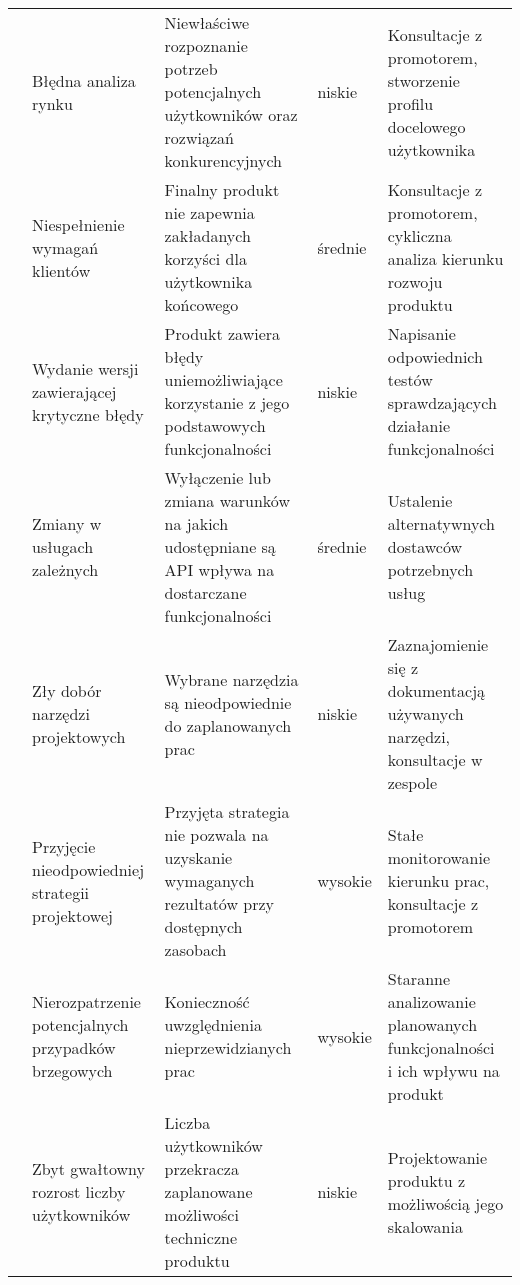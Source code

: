 \begin{longtable}{|p{.1\linewidth}|p{}|p{}|p{}|p{}|}
    \hline
    \pagebreak
    \hline
    \multirow{5}{=}{\parbox[c]{10cm}{}} & Błędna analiza rynku & Niewłaściwe rozpoznanie potrzeb potencjalnych użytkowników oraz rozwiązań konkurencyjnych & niskie
    & Konsultacje z promotorem, stworzenie profilu docelowego użytkownika \\
    \cline{2-5}
    & Niespełnienie wymagań klientów & Finalny produkt nie zapewnia zakładanych korzyści dla użytkownika końcowego & średnie
    & Konsultacje z promotorem, cykliczna analiza kierunku rozwoju produktu \\
    \cline{2-5}
    & Wydanie wersji zawierającej krytyczne błędy & Produkt zawiera błędy uniemożliwiające korzystanie z jego podstawowych funkcjonalności & niskie
    & Napisanie odpowiednich testów sprawdzających działanie funkcjonalności \\
    \cline{2-5}
    & Zmiany w usługach zależnych & Wyłączenie lub zmiana warunków na jakich udostępniane są API wpływa na dostarczane funkcjonalności & średnie
    & Ustalenie alternatywnych dostawców potrzebnych usług \\
    \cline{2-5}
    & Zły dobór narzędzi projektowych & Wybrane narzędzia są nieodpowiednie do zaplanowanych prac & niskie
    & Zaznajomienie się z dokumentacją używanych narzędzi, konsultacje w zespole \\
    \hline
    \pagebreak
    \hline
    \multirow{2}{=}{\parbox[c]{3.5cm}{}} & Przyjęcie nieodpowiedniej strategii projektowej & Przyjęta strategia nie pozwala na uzyskanie wymaganych rezultatów przy dostępnych zasobach & wysokie
    & Stałe monitorowanie kierunku prac, konsultacje z promotorem \\
    \cline{2-5}
    & Nierozpatrzenie potencjalnych przypadków brzegowych & Konieczność uwzględnienia nieprzewidzianych prac & wysokie
    & Staranne analizowanie planowanych funkcjonalności i ich wpływu na produkt \\
    \hline
    \multirow{1}{=}{\parbox[c]{3.5cm}{}}& Zbyt gwałtowny rozrost liczby użytkowników & Liczba użytkowników przekracza zaplanowane możliwości techniczne produktu & niskie
    & Projektowanie produktu z możliwością jego skalowania \\
    \hline

\end{longtable}
\pagebreak
